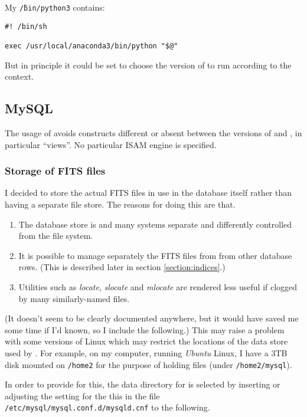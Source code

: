 My \texttt{\~/bin/python3} contains:

\begin{verbatim}
#! /bin/sh

exec /usr/local/anaconda3/bin/python "$@"
\end{verbatim}

But in principle it could be set to choose the version of {\py} to run according
to the context.

\subsection{MySQL}
\protect\label{section:mysql}

The usage of {\mysql} avoids constructs different or absent between the versions
of {\mysql} and \maria, in particular ``views''. No particular ISAM engine is
specified.

\subsubsection{Storage of FITS files}
\protect\label{section:fitsstorage}

I decided to store the actual FITS files in use in the database itself rather
than having a separate file store. The reasons for doing this are that.

\begin{enumerate}
  \item The database store is and many systems separate and differently
  controlled from the file system.
  \item It is possible to manage separately the FITS files from from other
  database rows. (This is described later in section \ref{section:indices}.)
  \item Utilities such as \textit{locate}, \textit{slocate} and \textit{mlocate}
  are rendered less useful if clogged by many similarly-named files.
\end{enumerate}

(It doesn't seem to be clearly documented anywhere, but it would have saved me
some time if I'd known, so I include the following.)
This may raise a problem with some versions of Linux which may restrict the locations of the data store used by \mysql. For
example, on my computer, running  \textit{Ubuntu} Linux, I have a 3TB disk
mounted on \texttt{/home2} for the purpose of holding {\mysql} files (under \texttt{/home2/mysql}).

In order to provide for this, the data directory for {\mysql} is selected by
inserting or adjusting the setting for the this in the file
\texttt{/etc/mysql/mysql.conf.d/mysqld.cnf} to the following.

